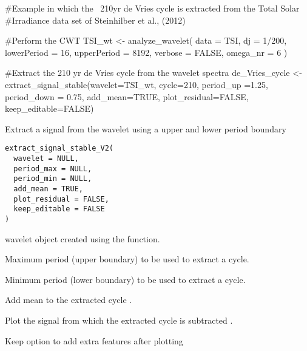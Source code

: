 \documentclass[a4paper]{book}
\begin{document}
%
\begin{Examples}
\begin{ExampleCode}
#Example in which the ~210yr de Vries cycle is extracted from the Total Solar
#Irradiance data set of Steinhilber et al., (2012)

#Perform the CWT
TSI_wt <-
analyze_wavelet(
data = TSI,
dj = 1/200,
lowerPeriod = 16,
upperPeriod = 8192,
   verbose = FALSE,
   omega_nr = 6
 )

#Extract the 210 yr de Vries cycle from the wavelet spectra
de_Vries_cycle <- extract_signal_stable(wavelet=TSI_wt,
cycle=210,
period_up =1.25,
period_down = 0.75,
add_mean=TRUE,
plot_residual=FALSE,
keep_editable=FALSE)

\end{ExampleCode}
\end{Examples}
%
\begin{Description}
Extract a signal from the wavelet using a upper and lower period boundary
\end{Description}
%
\begin{Usage}
\begin{verbatim}
extract_signal_stable_V2(
  wavelet = NULL,
  period_max = NULL,
  period_min = NULL,
  add_mean = TRUE,
  plot_residual = FALSE,
  keep_editable = FALSE
)
\end{verbatim}
\end{Usage}
%
\begin{Arguments}
\begin{ldescription}
\item[\code{wavelet}] wavelet object created using the  function.

\item[\code{period\_max}] Maximum period (upper boundary) to be used to extract a cycle.

\item[\code{period\_min}] Minimum period (lower boundary) to be used to extract a cycle.

\item[\code{add\_mean}] Add mean to the extracted cycle .

\item[\code{plot\_residual}] Plot the signal from which the extracted cycle is subtracted .

\item[\code{keep\_editable}] Keep option to add extra features after plotting  
\end{ldescription}
\end{Arguments}
\end{document}
